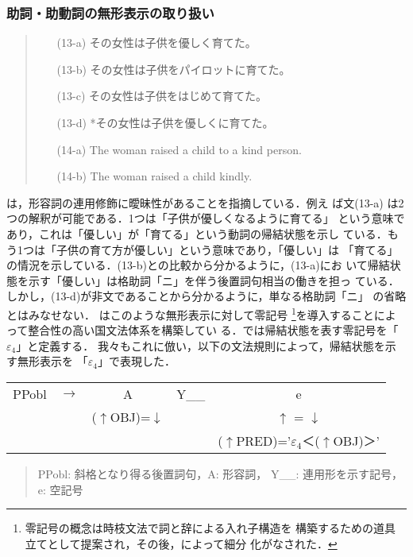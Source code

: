 \subsubsection{助詞・助動詞の無形表示の取り扱い}
\begin{quote}
\begin{itemize}
\item[(13-a)] その女性は子供を優しく育てた。
\item[(13-b)] その女性は子供をパイロットに育てた。
\item[(13-c)] その女性は子供をはじめて育てた。
\item[(13-d)] *その女性は子供を優しくに育てた。
\item[(14-a)] The woman raised a child to a kind person.  
\item[(14-b)] The woman raised a child kindly.  
\end{itemize}
\end{quote}
\cite{daitai}は，形容詞の連用修飾に曖昧性があることを指摘している．例え
ば文(13-a) は2つの解釈が可能である．1つは「子供が優しくなるように育てる」
という意味であり，これは「優しい」が「育てる」という動詞の帰結状態を示し
ている．もう1つは「子供の育て方が優しい」という意味であり，「優しい」は
「育てる」の情況を示している．(13-b)との比較から分かるように，(13-a)にお
いて帰結状態を示す「優しい」は格助詞「ニ」を伴う後置詞句相当の働きを担っ
ている．しかし，(13-d)が非文であることから分かるように，単なる格助詞「ニ」
の省略とはみなせない．\cite{daitai} はこのような無形表示に対して零記号
\footnote{零記号の概念は時枝文法\cite{tokieda}で詞と辞による入れ子構造を
構築するための道具立てとして提案され，その後，\cite{daitai}によって細分
化がなされた．}を導入することによって整合性の高い国文法体系を構築してい
る．\cite{daitai}では帰結状態を表す零記号を「$\varepsilon_4$」と定義する．
我々もこれに倣い，以下の文法規則によって，帰結状態を示す無形表示を
「$\varepsilon_4$」で表現した\cite{ohkuma}．

\begin{table}[htbp]
\begin{center}
\begin{tabular}{llccc}
\vspace{-1mm}
PPobl\quad & $\longrightarrow$ \qquad &  A \qquad & \qquad Y\_\_ & e\\
\vspace{-1mm}
&&($\uparrow$OBJ)=$\downarrow$&& $\uparrow$ = $\downarrow$ \\
&&&&($\uparrow$PRED)='$\varepsilon_4$＜($\uparrow$OBJ)＞'\\
\end{tabular}
\end{center}
\vspace{2mm}
\begin{quote}
PPobl: 斜格となり得る後置詞句，A: 形容詞， Y\_\_: 連用形を示す記号，e: 空記号
\end{quote}
\end{table}

